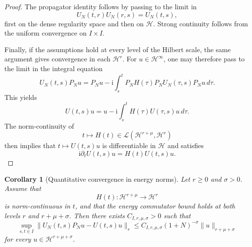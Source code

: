 \documentclass[10pt,a4paper]{amsart}
\newtheorem{corollary}[theorem]{Corollary}
\newcommand{\Hilb}{\mathcal H}
\newcommand{\ii}{\mathrm i}
\begin{document}
\begin{proof}
The propagator identity follows by passing to the limit in
\[
U_{N}(t,r)U_{N}(r,s)=U_{N}(t,s),
\]
first on the dense regularity space and then on \(\Hilb\).
Strong continuity follows from the uniform convergence on \(I\times I\).

Finally, if the assumptions hold at every level of the Hilbert scale, the
same argument gives convergence in each \(\Hilb^{r}\). For
\(u\in\Hilb^{\infty}\), one may therefore pass to the limit in the
integral equation
\[
U_{N}(t,s)P_{N}u
=
P_{N}u
-
\ii
\int_{s}^{t}
P_{N}H(\tau)P_{N}
U_{N}(\tau,s)P_{N}u\,d\tau.
\]
This yields
\[
U(t,s)u
=
u
-
\ii
\int_{s}^{t}H(\tau)U(\tau,s)u\,d\tau.
\]
The norm-continuity of
\[
t\longmapsto H(t)\in
\mathcal{L}(\Hilb^{r+\mu},\Hilb^{r})
\]
then implies that \(t\mapsto U(t,s)u\) is differentiable in
\(\Hilb\) and satisfies
\[
\ii\partial_{t}U(t,s)u=H(t)U(t,s)u.
\]
\end{proof}

\begin{corollary}[Quantitative convergence in energy norms]
\label{cor:quantitative-energy-convergence}
Let \(r\geq0\) and \(\sigma>0\). Assume that
\[
H(t):\Hilb^{r+\mu}\longrightarrow\Hilb^r
\]
is norm-continuous in \(t\), and that the energy commutator bound holds
at both levels \(r\) and \(r+\mu+\sigma\). Then there exists
\(C_{I,r,\mu,\sigma}>0\) such that
\[
\sup_{s,t\in I}
\|U_N(t,s)P_Nu-U(t,s)u\|_r
\leq
C_{I,r,\mu,\sigma}(1+N)^{-\sigma}
\|u\|_{r+\mu+\sigma}
\]
for every \(u\in\Hilb^{r+\mu+\sigma}\).
\end{corollary}
\end{document}
